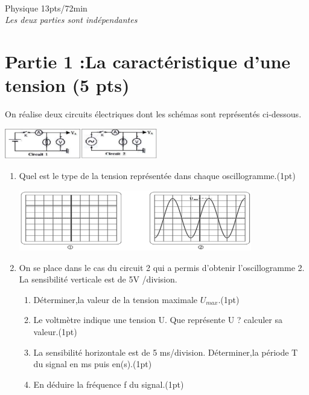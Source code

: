 \documentclass[12pt]{article}
\begin{document}
\hrulefill\\
\begin{center}
\hrulefill
\Large{Physique 13pts/72min}
\hrulefill\\
    \emph{Les deux parties sont indépendantes}
\end{center}

 \section*{Partie 1 :La caractéristique d'une tension \dotfill(5 pts)}


On réalise deux circuits électriques dont les schémas sont représentés ci-dessous.
\begin{center}
    \includegraphics[width=0.5\textwidth]{./img/circuit_Ex_00.png}
\end{center}

\begin{enumerate}
    \item Quel est le type de la tension représentée dans  chaque oscillogramme.\dotfill(1pt)
\begin{center}
    \includegraphics[width=0.8\textwidth]{./img/oscillo.png}
\end{center}
\item On se place dans le cas du circuit 2 qui a permis d’obtenir l’oscillogramme 2. La sensibilité verticale est de 5V /division.

    \begin{enumerate}
        \item Déterminer,la valeur de la tension maximale $U_{max}$.\dotfill(1pt)
        \item Le voltmètre indique une tension U. Que représente U ? calculer sa valeur.\dotfill(1pt)
        \item La sensibilité horizontale est de 5 ms/division.
            Déterminer,la période T du signal en ms puis en(s).\dotfill(1pt)
        \item En déduire la fréquence f du signal.\dotfill(1pt)
    \end{enumerate}
\end{enumerate}
\end{document}
